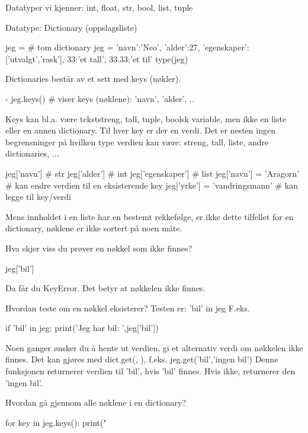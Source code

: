 Datatyper vi kjenner: int, float, str, bool, list, tuple 

Datatype: Dictionary (oppslagsliste)

\begin{usncodebox}
jeg = {}  # tom dictionary
jeg = {'navn':'Neo', 'alder':27, 'egenskaper':['utvalgt','rask'], 33:'et tall', 33.33:'et til'} 
type(jeg) 
\end{usncodebox}

Dictionaries består av et sett med keys (nøkler).
\begin{usncodebox}
- jeg.keys()  # viser keys (nøklene): 'navn', 'alder', ..
\end{usncodebox}

Keys kan bl.a. være tekststreng, tall, tuple, boolsk variable, men ikke en liste eller en annen dictionary. Til hver key er der en verdi.  Det er nesten ingen begrensninger på hvilken type verdien kan være: streng, tall, liste, andre dictionaries, ...

\begin{usncodebox}
jeg['navn']         # str
jeg['alder']        # int
jeg['egenskaper']   # list
jeg['navn'] = 'Aragorn'        # kan endre verdien til en eksisterende key
jeg['yrke'] = 'vandringsmann'  # kan legge til key/verdi 
\end{usncodebox}

Mens innholdet i en liste har en bestemt rekkefølge, er ikke dette tilfellet for en dictionary, nøklene er ikke sortert på noen måte.

Hva skjer viss du prøver en nøkkel som ikke finnes?
\begin{usncodebox}
jeg['bil']
\end{usncodebox}

Da får du KeyError. Det betyr at nøkkelen ikke finnes.

Hvordan teste om en nøkkel eksisterer? Testen er: 'bil' in jeg
F.eks.
\begin{usncodebox}
if 'bil' in jeg:
   print('Jeg har bil: ',jeg['bil'])
\end{usncodebox}

Noen ganger ønsker du å hente ut verdien, gi et alternativ verdi om nøkkelen ikke finnes. Det kan gjøres med dict.get(, ), f.eks. jeg.get('bil','ingen bil') Denne funksjonen returnerer verdien til 'bil', hvis 'bil' finnes. Hvis ikke, returnerer den 'ingen bil'.

Hvordan gå gjennom alle nøklene i en dictionary?
\begin{usncodebox}
for key in jeg.keys():
   print("  %
\end{usncodebox}

